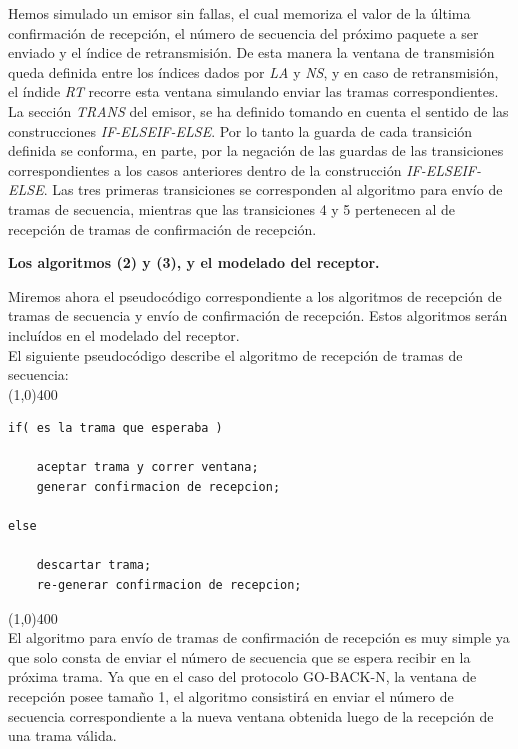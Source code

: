 \documentclass[titlepage, 12pt]{book}
\begin{document}
Hemos simulado un emisor sin fallas, el cual memoriza el valor de la \'ultima confirmaci\'on de recepci\'on, el n\'umero de secuencia del pr\'oximo paquete a ser enviado y el \'indice de retransmisi\'on. De esta manera la ventana de transmisi\'on queda definida entre los \'indices dados por \textit{LA} y \textit{NS}, y en caso de retransmisi\'on, el \'indide \textit{RT} recorre esta ventana simulando enviar las tramas correspondientes.\\

La secci\'on \textit{TRANS} del emisor, se ha definido tomando en cuenta el sentido de las construcciones \textit{IF-ELSEIF-ELSE}. Por lo tanto la guarda de cada transici\'on definida se conforma, en parte, por la negaci\'on de las guardas de las transiciones correspondientes a los casos anteriores dentro de la construcci\'on \textit{IF-ELSEIF-ELSE}. Las tres primeras transiciones se corresponden al algoritmo para env\'io de tramas de secuencia, mientras que las transiciones 4 y 5 pertenecen al de recepci\'on de tramas de confirmaci\'on de recepci\'on.\\


\begin{center}
\textbf{\large Los algoritmos (2) y (3), y el modelado del receptor.}
\end{center}

Miremos ahora el pseudoc\'odigo correspondiente a los algoritmos de recepci\'on de tramas de secuencia y env\'io de confirmaci\'on de recepci\'on. Estos algoritmos ser\'an inclu\'idos en el modelado del receptor.\\

El siguiente pseudoc\'odigo describe el algoritmo de recepci\'on de tramas de secuencia:\\

\noindent \line(1,0){400}\\

\begin{verbatim}
if( es la trama que esperaba )

    aceptar trama y correr ventana;
    generar confirmacion de recepcion;
    
else

    descartar trama;
    re-generar confirmacion de recepcion;
\end{verbatim}

\noindent \line(1,0){400}\\

El algoritmo para env\'io de tramas de confirmaci\'on de recepci\'on es muy simple ya que solo consta de enviar el número de secuencia que se espera recibir en la pr\'oxima trama. Ya que en el caso del protocolo GO-BACK-N, la ventana de recepci\'on posee tama\~no 1, el algoritmo consistir\'a en enviar el n\'umero de secuencia correspondiente a la nueva ventana obtenida luego de la recepci\'on de una trama v\'alida.\\
\end{document}
